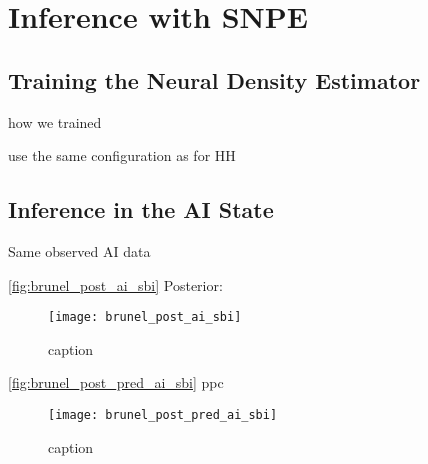


\section{Inference with SNPE}

\subsection{Training the Neural Density Estimator}

how we trained 

use the same configuration as for HH

\subsection{Inference in the AI State}

Same observed AI data

\autoref{fig:brunel_post_ai_sbi} Posterior:

\begin{figure}[!htb]
    \centering
    \texttt{[image: brunel\_post\_ai\_sbi]}
    \caption{caption}
    \label{fig:brunel_post_ai_sbi}
\end{figure}

\autoref{fig:brunel_post_pred_ai_sbi} ppc 

\begin{figure}[!htb]
    \centering
    \texttt{[image: brunel\_post\_pred\_ai\_sbi]}
    \caption{caption}
    \label{fig:brunel_post_pred_ai_sbi}
\end{figure}


